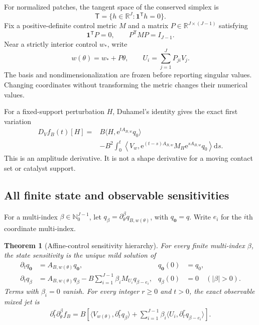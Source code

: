\documentclass[aps,physrev,onecolumn,amsmath,amssymb,longbibliography]{revtex4-2}
\newcommand{\dd}{\mathrm d}
\newcommand{\e}{\mathrm e}
\newcommand{\Tspace}{\mathsf T}
\newtheorem{theorem}{Theorem}[section]
\begin{document}
For normalized patches, the tangent space of the conserved simplex is
\begin{equation}
 \Tspace=\{h\in\mathbb R^J:\bm1^{\mathsf T}h=0\}.
 \label{eq:tangent-space}
\end{equation}
Fix a positive-definite control metric \(M\) and a matrix
\(P\in\mathbb R^{J\times(J-1)}\) satisfying
\begin{equation}
 \bm1^{\mathsf T}P=0,
 \qquad P^{\mathsf T}MP=I_{J-1}.
 \label{eq:frozen-basis}
\end{equation}
Near a strictly interior control \(w_*\), write
\begin{equation}
 w(\theta)=w_*+P\theta,\qquad
 U_i=\sum_{j=1}^JP_{ji}V_j.
 \label{eq:theta-control}
\end{equation}
The basis and nondimensionalization are frozen before reporting singular
values.  Changing coordinates without transforming the metric changes their
numerical values.

For a fixed-support perturbation \(H\), Duhamel's identity gives the exact
first variation
\begin{align}
 D_Vf_B(t)[H]
={}&B\langle H,\e^{tA_{B,w}}q_0\rangle\nonumber\\
&-B^2\int_0^t
 \left\langle V_w,
 \e^{(t-s)A_{B,w}}M_H\e^{sA_{B,w}}q_0
 \right\rangle\dd s.
 \label{eq:duhamel-variation}
\end{align}
This is an amplitude derivative.  It is not a shape derivative for a moving
contact set or catalyst support.

\subsection{All finite state and observable sensitivities}

For a multi-index \(\beta\in\mathbb N_0^{J-1}\), let
\(q_\beta=\partial_\theta^\beta q_{B,w(\theta)}\), with \(q_{\bm0}=q\).
Write \(e_i\) for the \(i\)th coordinate multi-index.

\begin{theorem}[Affine-control sensitivity hierarchy]
\label{thm:sensitivity-hierarchy}
For every finite multi-index \(\beta\), the state sensitivity is the unique
mild solution of
\begin{align}
 \partial_tq_{\bm0}&=A_{B,w(\theta)}q_{\bm0},
 &q_{\bm0}(0)&=q_0,
 \label{eq:hierarchy-zero}\\
 \partial_tq_\beta
 &=A_{B,w(\theta)}q_\beta
   -B\sum_{i=1}^{J-1}\beta_iM_{U_i}q_{\beta-e_i},
 &q_\beta(0)&=0\quad(|\beta|>0).
 \label{eq:hierarchy-general}
\end{align}
Terms with \(\beta_i=0\) vanish.  For every integer \(r\ge0\) and \(t>0\),
the exact observable mixed jet is
\begin{align}
 \partial_t^r\partial_\theta^\beta f_B
 =B\left[
 \langle V_{w(\theta)},\partial_t^rq_\beta\rangle
 +\sum_{i=1}^{J-1}\beta_i
  \langle U_i,\partial_t^rq_{\beta-e_i}\rangle
 \right].
 \label{eq:observable-hierarchy}
\end{align}
\end{theorem}
\end{document}
